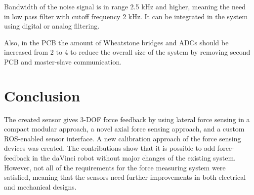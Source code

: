 	Bandwidth of the noise signal is in range 2.5 kHz and higher, meaning the need in low pass filter with cutoff frequency 2 kHz. It can be integrated in the system using digital or analog filtering. 
    
    Also, in the PCB the amount of Wheatstone bridges and ADCs should be increased from 2 to 4 to reduce the overall size of the system by removing second PCB and master-slave communication.
	
\section{Conclusion}

The created sensor gives 3-DOF force feedback by using lateral force sensing in a compact modular approach, a novel axial force sensing approach, and a custom ROS-enabled sensor interface. A new calibration approach of the force sensing devices was created. The contributions show that it is possible to add force-feedback in the daVinci robot without major changes of the existing system. However, not all of the requirements for the force measuring system were satisfied, meaning that the sensors need further improvements in both electrical and mechanical designs.